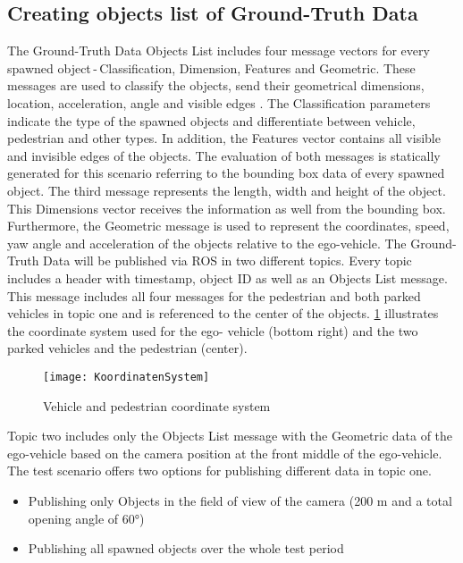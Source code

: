 \subsection{Creating objects list of Ground-Truth Data}
The Ground-Truth Data Objects List includes four message vectors for every spawned object\,-\,Classification, Dimension, Features and Geometric. These messages are used to classify the objects, send their geometrical dimensions, location, acceleration, angle and visible edges \cite{Aeberhard}.
The Classification parameters indicate the type of the spawned objects and differentiate between vehicle, pedestrian and other types. In addition, the Features vector contains all visible and invisible edges of the objects. The evaluation of both messages is statically generated for this scenario referring to the bounding box data of every spawned object. The third message represents the length, width and height of the object. This Dimensions vector receives the information as well from the bounding box. Furthermore, the Geometric message is used to represent the coordinates, speed, yaw angle and acceleration of the objects relative to the ego-vehicle. 
The Ground-Truth Data will be published via \ac{ROS} in two different topics. Every topic includes a header with timestamp, object \ac{ID} as well as an Objects List message. This message includes all four messages for the pedestrian and both parked vehicles in topic one and is referenced to the center of the objects. \cref{coordinate} illustrates the coordinate system used for the ego- vehicle (bottom right) and the two parked vehicles and the pedestrian (center). 
\begin{figure}[!h]
	\centering
	\texttt{[image: KoordinatenSystem]}
	\caption{Vehicle and pedestrian coordinate system}
	\label{coordinate}
\end{figure}

Topic two includes only the Objects List message with the Geometric data of the ego-vehicle based on the camera position at the front middle of the ego-vehicle.
The test scenario offers two options for publishing different data in topic one.
\begin{itemize}
	\item Publishing only Objects in the field of view of the camera (200 m and a total opening angle of \ang{60})
	\item Publishing all spawned objects over the whole test period
\end{itemize}


